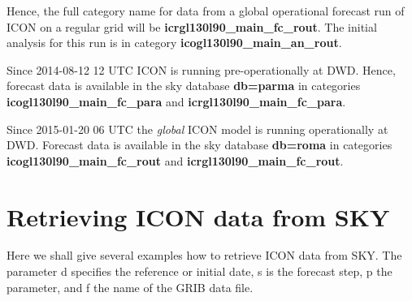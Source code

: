 Hence, the full category name for data from a global operational forecast run of ICON on a
regular grid will be \textbf{icrgl130l90\_main\_fc\_rout}. The initial analysis for this
run is in category \textbf{icogl130l90\_main\_an\_rout}.

\begin{note}
Since 2014-08-12 12 UTC ICON is running pre-operationally at DWD. Hence, forecast data
is available in the sky database \textbf{db=parma} in categories
\textbf{icogl130l90\_main\_fc\_para} and \textbf{icrgl130l90\_main\_fc\_para}.
\end{note}

\begin{note}
Since 2015-01-20 06 UTC the \emph{global} ICON model is running operationally at DWD.
Forecast data is available in the sky database \textbf{db=roma} in categories
\textbf{icogl130l90\_main\_fc\_rout} and \textbf{icrgl130l90\_main\_fc\_rout}.
\end{note}

\section{Retrieving ICON data from SKY}\label{sec_example}

Here we shall give several examples how to retrieve ICON data from SKY.
The parameter d specifies the reference or initial date, s is the forecast step, p the parameter,
and f the name of the GRIB data file.

